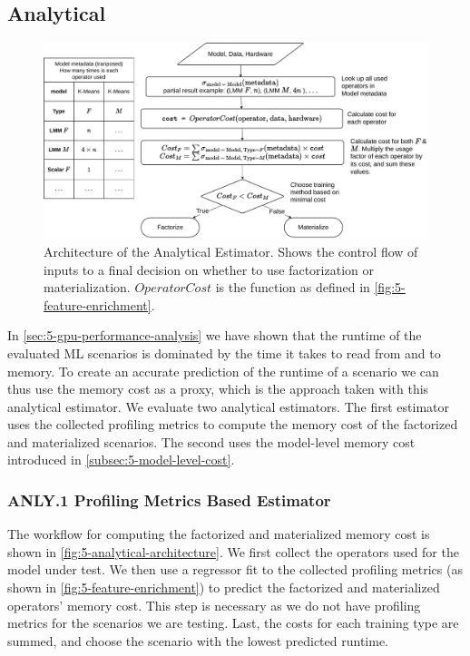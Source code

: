 \subsection{Analytical}
\label{subsec:5-analytical}
\begin{figure}[ht]
    \centering
    \includegraphics[width=\linewidth]{chapters/05_cost_estimation/figures/analytical-architecture.pdf}
    \caption[Analytical Estimator Architecture]{Architecture of the Analytical Estimator. Shows the control flow of inputs to a final decision on whether to use factorization or materialization. $OperatorCost$ is the function as defined in \autoref{fig:5-feature-enrichment}.}
    \label{fig:5-analytical-architecture}
\end{figure}
In \autoref{sec:5-gpu-performance-analysis} we have shown that the runtime of the evaluated ML scenarios is dominated by the time it takes to read from and to memory. To create an accurate prediction of the runtime of a scenario we can thus use the memory cost as a proxy, which is the approach taken with this analytical estimator. We evaluate two analytical estimators. The first estimator uses the collected profiling metrics to compute the memory cost of the factorized and materialized scenarios. The second uses the model-level memory cost introduced in \autoref{subsec:5-model-level-cost}.

\subsubsection{ANLY.1 Profiling Metrics Based Estimator}

The workflow for computing the factorized and materialized memory cost is shown in \autoref{fig:5-analytical-architecture}. We first collect the operators used for the model under test. We then use a regressor fit to the collected profiling metrics (as shown in \autoref{fig:5-feature-enrichment}) to predict the factorized and materialized operators' memory cost. This step is necessary as we do not have profiling metrics for the scenarios we are testing. Last, the costs for each training type are summed, and choose the scenario with the lowest predicted runtime.

